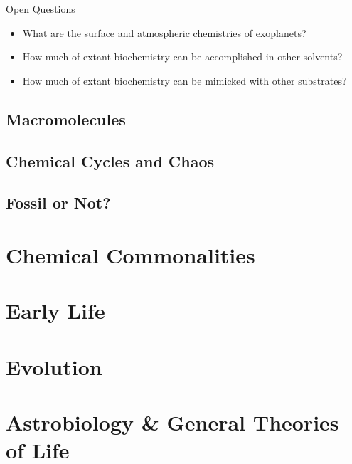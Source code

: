 \documentclass[]{article}
\begin{document}
Open Questions
\begin{itemize}
	\item What are the surface and atmospheric chemistries of
	exoplanets?
	\item How much of extant biochemistry can be accomplished
	in other solvents?
	\item How much of extant biochemistry can be mimicked with
	other substrates?
\end{itemize}
\subsection{Macromolecules}
\subsection{Chemical Cycles and Chaos}
\subsection{Fossil or Not?}

\section{Chemical Commonalities}

\section{Early Life}

\section{Evolution}

\section{Astrobiology \& General Theories of Life}



\end{document}
